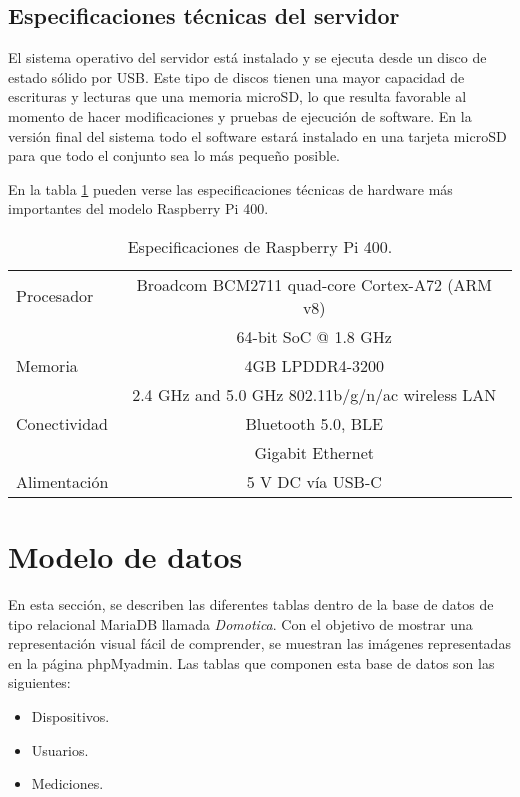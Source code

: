 \subsection{Especificaciones técnicas del servidor}

El sistema operativo del servidor está instalado y se ejecuta desde un disco de estado sólido por USB. Este tipo de discos tienen una mayor capacidad de escrituras y lecturas que una memoria microSD, lo que resulta favorable al momento de hacer modificaciones y pruebas de ejecución de software. En la versión final del sistema todo el software estará instalado en una tarjeta microSD para que todo el conjunto sea lo más pequeño posible.

En la tabla \ref{tab:Especificaciones Raspberry Pi 400} pueden verse las especificaciones técnicas de hardware más importantes del modelo Raspberry Pi 400.

\begin{table}[h]
\centering
\caption[Raspberry Pi 400]{Especificaciones de Raspberry Pi 400.}
\begin{tabular}{l c}
\toprule
Procesador		&	Broadcom BCM2711 quad-core Cortex-A72 (ARM v8) \\
				&	64-bit SoC @ 1.8 GHz \\
\midrule
Memoria			&	4GB LPDDR4-3200 \\
\midrule
				&	2.4 GHz and 5.0 GHz 802.11b/g/n/ac wireless LAN \\
Conectividad		&	Bluetooth 5.0, BLE\\
				&   Gigabit Ethernet \\
\midrule
Alimentación		&	5 V DC vía USB-C\\
\bottomrule
\hline
\end{tabular}
\label{tab:Especificaciones Raspberry Pi 400}
\end{table}

\section{Modelo de datos}

En esta sección, se describen las diferentes tablas dentro de la base de datos de tipo relacional MariaDB llamada \textit{Domotica}. Con el objetivo de mostrar una representación visual fácil de comprender, se muestran las imágenes representadas en la página phpMyadmin. Las tablas que componen esta base de datos son las siguientes:

\begin{itemize}
	\item Dispositivos.
	\item Usuarios.
	\item Mediciones.
\end{itemize}


